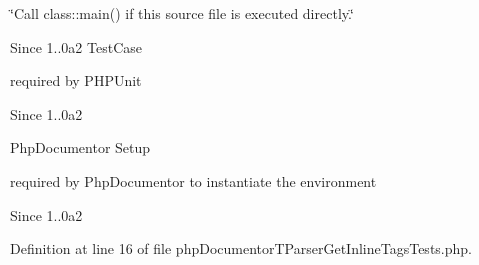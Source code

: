 \char`\"{}\-Call class\-::main() if this source file is executed directly.\char`\"{} \begin{DoxySince}{\-Since}
1..\-0a2 \-Test\-Case
\end{DoxySince}
required by \-P\-H\-P\-Unit \begin{DoxySince}{\-Since}
1..\-0a2
\end{DoxySince}
\-Php\-Documentor \-Setup

required by \-Php\-Documentor to instantiate the environment \begin{DoxySince}{\-Since}
1..\-0a2 
\end{DoxySince}


\-Definition at line 16 of file php\-Documentor\-T\-Parser\-Get\-Inline\-Tags\-Tests.\-php.


